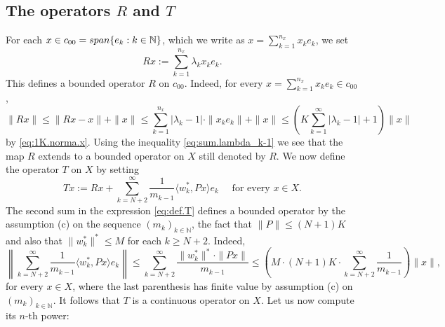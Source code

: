 \documentclass[openright,11pt]{article}
\theoremstyle{plain}
\theoremstyle{definition}
\newcommand{\NN}{\mathbb{N}}
\newcommand{\lspan}{\textup{span}}
\newcommand{\ep}[2]{\langle #1 , #2 \rangle}
\begin{document}
\subsection{The operators $R$ and $T$}

For each $x \in c_{00} = \lspan\{ e_k : k \in \NN \}$, which we write as $x = \sum_{k=1}^{n_x} x_k e_k$, we set
\[
Rx := \sum_{k=1}^{n_x} \lambda_kx_ke_k.
\]
This defines a bounded operator $R$ on $c_{00}$. Indeed, for every $x = \sum_{k=1}^{n_x} x_ke_k \in c_{00}$,
\[
\|Rx\| \leq \|Rx-x\| + \|x\| \leq \sum_{k=1}^{n_x} |\lambda_k-1| \cdot \|x_ke_k\| + \|x\| \leq \left( K \sum_{k=1}^{\infty} |\lambda_k-1| + 1 \right) \|x\|
\]
by \eqref{eq:1K.norma.x}. Using the inequality \eqref{eq:sum.lambda_k-1} we see that the map $R$ extends to a bounded operator on $X$ still denoted by $R$. We now define the operator $T$ on $X$ by setting
\begin{equation}\label{eq:def.T}
	Tx := Rx + \sum_{k=N+2}^{\infty} \frac{1}{m_{k-1}} \ep{w_k^*}{Px} e_k \quad \text{ for every } x \in X.
\end{equation}
The second sum in the expression \eqref{eq:def.T} defines a bounded operator by the assumption (c) on the sequence $(m_k)_{k\in\NN}$, the fact that $\|P\| \leq (N+1)K$ and also that $\|w_k^*\|^* \leq M$ for each $k\geq N+2$. Indeed,
\[
\left\| \sum_{k=N+2}^{\infty} \frac{1}{m_{k-1}} \ep{w_k^*}{Px} e_k \right\| \leq \sum_{k=N+2}^{\infty} \frac{\|w_k^*\|^* \cdot \|Px\|}{m_{k-1}} \leq \left(M \cdot (N+1) K \cdot \sum_{k=N+2}^{\infty} \frac{1}{m_{k-1}}\right) \|x\|,
\]
for every $x \in X$, where the last parenthesis has finite value by assumption (c) on $(m_k)_{k \in \NN}$. It follows that $T$ is a continuous operator on $X$. Let us now compute its $n$-th power:
\end{document}
